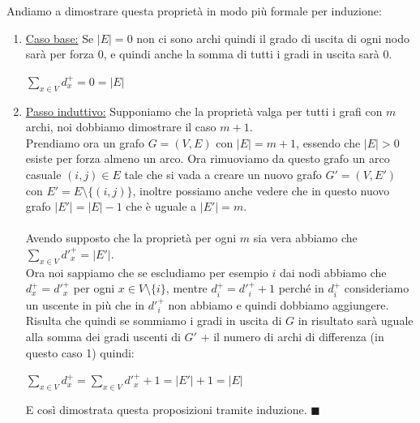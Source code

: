 \begin{demostration}
Andiamo a dimostrare questa proprietà in modo più formale per induzione:
\begin{enumerate}
    \item \underline{Caso base:} Se $\lvert E\rvert = 0$ non ci sono archi quindi il grado di uscita di ogni nodo sarà per forza 0, e quindi anche la somma di tutti i gradi in uscita sarà 0.
    \begin{center}
        $\sum\limits_{x \in V}d^+_x = 0 = \lvert E\rvert $
    \end{center}
    \item \underline{Passo induttivo:} Supponiamo che la proprietà valga per tutti i grafi con $m$ archi, noi dobbiamo dimostrare il caso $m+1$. \\
    Prendiamo ora un grafo $G = (V,E)$ con $\lvert E\rvert = m+1$, essendo che $\lvert E \rvert > 0$ esiste per forza almeno un arco. Ora rimuoviamo da questo grafo un arco casuale $(i,j) \in E$ tale che si vada a creare un nuovo grafo $G' = (V, E')$ con $E' = E \setminus \{(i,j)\}$, inoltre possiamo anche vedere che in questo nuovo grafo $\lvert E'\rvert = \lvert E\rvert - 1$ che è uguale a $\lvert E'\rvert = m$.\\\\
    Avendo supposto che la proprietà per ogni $m$ sia vera abbiamo che $\sum_{x\in V}d'^+_x = \lvert E'\rvert$. 
    \\Ora noi sappiamo che se escludiamo per esempio $i$ dai nodi abbiamo che $d^+_x = d'^+_x$ per ogni $x \in V \setminus \{ i \}$, mentre $d^+_i = d'^+_i + 1$ perché in $d^+_i$ consideriamo un uscente in più che in $d'^+_i$ non abbiamo e quindi dobbiamo aggiungere. Risulta che quindi se sommiamo i gradi in uscita di $G$ in risultato sarà uguale alla somma dei gradi uscenti di $G'$ + il numero di archi di differenza (in questo caso 1) quindi:
    \begin{center}
        $\sum\limits_{x \in V}d^+_x = \sum\limits_{x \in V}d'^+_x + 1 = \lvert E'\rvert + 1 = \lvert E\rvert $
    \end{center}
    E così dimostrata questa proposizioni tramite induzione. $\blacksquare$
\end{enumerate}
\end{demostration}

